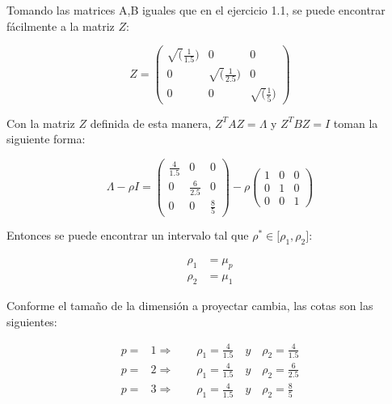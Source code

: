 \begin{example} \label{ex:2}
Tomando las matrices A,B iguales que en el ejercicio 1.1, se puede encontrar fácilmente a la matriz $Z$:


\begin{equation*}
Z = \left(\!
    \begin{array}{ccc}
      \sqrt(\frac{1}{1.5}) & 0 & 0 \\
      0 & \sqrt(\frac{1}{2.5}) & 0 \\
      0 & 0 & \sqrt(\frac{1}{5}) 
    \end{array}
  \!\right)
\end{equation*}

Con la matriz $Z$ definida de esta manera, $Z^T A  Z = \Lambda$ y $Z^T B Z = I$ toman la siguiente forma:

\begin{equation*}
\Lambda - \rho I = 
\left(\!
    \begin{array}{ccc}
      \frac{4}{1.5} & 0  & 0\\
      0 & \frac{6}{2.5}  & 0\\
      0 & 0 & \frac{8}{5}
    \end{array}
  \!\right) - \rho
  \left(\!
    \begin{array}{ccc}
      1 & 0 & 0\\
      0 & 1 & 0\\
      0 & 0 & 1
    \end{array}
  \!\right) 
\end{equation*}

Entonces se puede encontrar un intervalo tal que $\rho^* \in \big[\rho_1, \rho_2 \big]$:

\begin{equation*}
  \begin{aligned}
\rho_1 &= \mu_p \\
\rho_2 &= \mu_1  
  \end{aligned}
\end{equation*}

Conforme el tamaño de la dimensión a proyectar cambia, las cotas son las siguientes:

\begin{equation*}
  \begin{aligned}
  p =& 1 \Rightarrow \qquad \rho_1 = \frac{4}{1.5} \quad y \quad \rho_2 = \frac{4}{1.5}\\
  p =& 2 \Rightarrow \qquad \rho_1 = \frac{4}{1.5} \quad y \quad \rho_2 = \frac{6}{2.5} \\
  p =& 3 \Rightarrow \qquad \rho_1 = \frac{4}{1.5} \quad y \quad \rho_2 = \frac{8}{5}
  \end{aligned}
\end{equation*}
 


\end{example}
